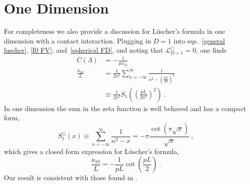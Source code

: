 \section{One Dimension}\label{sec:1D}
For completeness we also provide a discussion for L\"uscher's formula in one dimension with a contact interaction.  Plugging in $D=1$ into eqs.~\eqref{general luscher}, \eqref{I0 FV}, and~\eqref{spherical FD}, and noting that $\mathcal{L}_{D=1}^\bigcirc=0$, one finds 
\begin{align} 
C(\Lambda)&=-\frac{1}{\mu a_{10}}\\
\frac{a_{10}}{L} &=\frac{1}{2 \pi^{2}} \sum_{n=-\infty}^{\infty} \frac{1}{n^{2}-\left(\frac{p L}{2 \pi}\right)^{2}} \\ 
& \equiv \frac{1}{2 \pi^{2}} S_{1}\left(\left(\frac{p L}{2 \pi^{2}}\right)^{2}\right)\ .
\end{align}
In one dimension the sum in the zeta function is well behaved and has a compact form,
\begin{equation}
S^\bigcirc_{1}(x) \equiv \sum_{n=-\infty}^{\infty} \frac{1}{n^{2}-x}=-\pi \frac{\cot (\pi \sqrt{x})}{\sqrt{x}}\ ,
\end{equation}
which gives a closed form expression for L\"uscher's formula,
\begin{equation}\label{eq:1d luscher}
\frac{a_{10}}{L} =-\frac{1}{pL}\cot\left(\frac{pL}{2}\right)\ . 
\end{equation}
Our result is consistent with those found in \cite{}.

